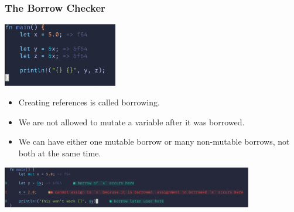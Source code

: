 \documentclass[dvipsnames,10pt]{beamer}
\begin{document}
\begin{frame}
\frametitle{The Borrow Checker}
\begin{minipage}{5cm}
\includegraphics[width=5cm]{../figs/rust_borrow}
\end{minipage}
\begin{minipage}{5cm}
\footnotesize
\begin{itemize}
\item Creating references is called borrowing.
\item We are not allowed to mutate a variable after it was borrowed.
\item We can have either one mutable borrow or many non-mutable borrows, not both at the same time.
\end{itemize}
\end{minipage}

\begin{center}
\includegraphics[width=11cm]{../figs/rust_mut}
\end{center}

\end{frame}
\end{document}
